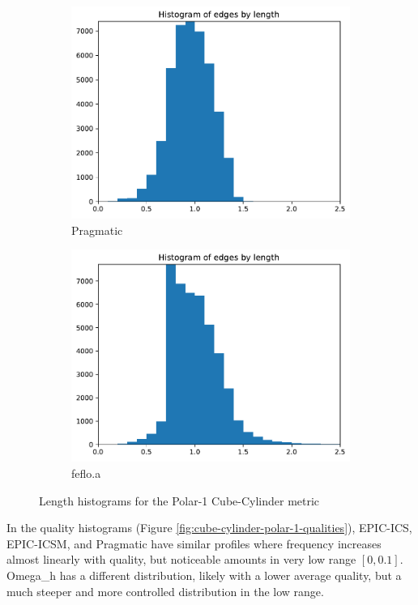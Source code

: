 \documentclass[3p,times,procedia,number]{elsarticle}
\begin{document}
\begin{figure}
\begin{subfigure}{.16\textwidth}
\includegraphics[width=\textwidth]{pragmatic-cube-cylinder-polar-1-length.pdf}
\caption{Pragmatic}
\end{subfigure}
\begin{subfigure}{.16\textwidth}
\centering
\includegraphics[width=\textwidth]{fefloa-cube-cylinder-polar-1-length.pdf}
\caption{feflo.a}
\end{subfigure}
\caption{Length histograms for the Polar-1 Cube-Cylinder metric}
\label{fig:cube-cylinder-polar-1-lengths}
\end{figure}

In the quality histograms (Figure \ref{fig:cube-cylinder-polar-1-qualities}),
EPIC-ICS, EPIC-ICSM, and Pragmatic have similar
profiles where frequency increases almost linearly with quality, but noticeable
amounts in very low range $[0,0.1]$.
Omega\_h has a different distribution, likely with a lower average quality,
but a much steeper and more controlled distribution in the low range.
\end{document}

